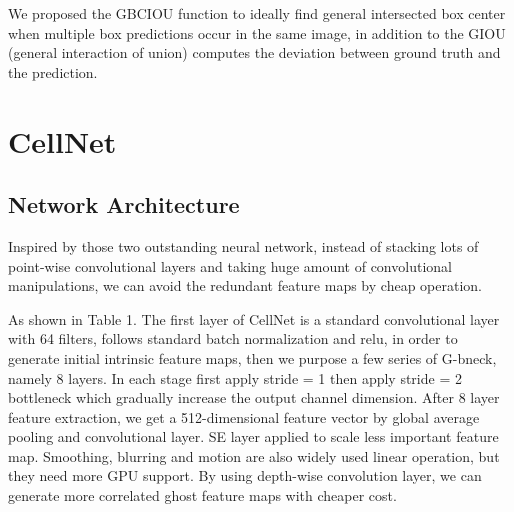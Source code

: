 We proposed the GBCIOU function to ideally find general intersected box center when multiple box predictions occur in the same image, in addition to the GIOU (general interaction of union) computes the deviation between ground truth and the prediction.

\section{CellNet}
\label{sec:ipsum}


\subsection{Network Architecture} %
\label{sub:Network Architecture_2}
Inspired by those two outstanding neural network\cite{b19}\cite{b20}, instead of stacking lots of point-wise convolutional layers and taking huge amount of convolutional manipulations, we can avoid the redundant feature maps by cheap operation. 

As shown in Table 1. The first layer of CellNet is a standard convolutional layer with 64 filters, follows standard batch normalization and relu, in order to generate initial intrinsic feature maps, then we purpose a few series of G-bneck, namely 8 layers. In each stage first apply stride = 1 then apply stride = 2 bottleneck which gradually increase the output channel dimension. After 8 layer feature extraction, we get a 512-dimensional feature vector by global average pooling and convolutional layer. SE layer applied to scale less important feature map. Smoothing, blurring and motion are also widely used linear operation, but they need more GPU support. By using depth-wise convolution layer, we can generate more correlated ghost feature maps with cheaper cost.



